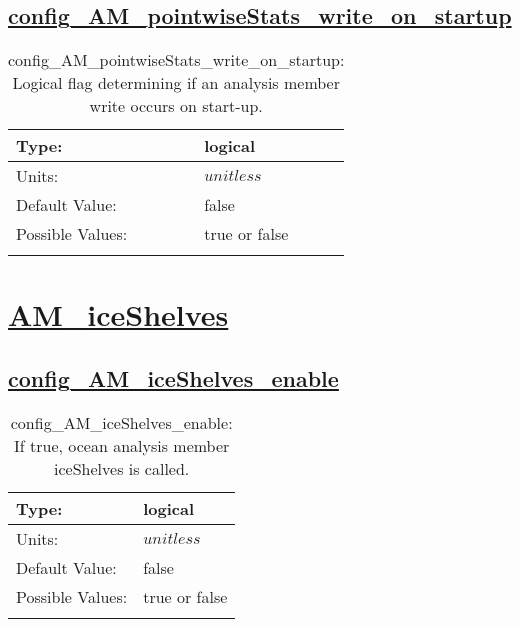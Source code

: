 \subsection[config\_AM\_pointwiseStats\_write\_on\_startup]{\hyperref[sec:nm_tab_AM_pointwiseStats]{config\_AM\_pointwiseStats\_write\_on\_startup}}
\label{subsec:nm_sec_config_AM_pointwiseStats_write_on_startup}
\begin{center}
\begin{longtable}{| p{2.0in} || p{4.0in} |}
    \hline
    Type: & logical \\
    \hline
    Units: & $unitless$ \\
    \hline
    Default Value: & false \\
    \hline
    Possible Values: & true or false \\
    \hline
    \caption{config\_AM\_pointwiseStats\_write\_on\_startup: Logical flag determining if an analysis member write occurs on start-up.}
\end{longtable}
\end{center}
\section[AM\_iceShelves]{\hyperref[sec:nm_tab_AM_iceShelves]{AM\_iceShelves}}
\label{sec:nm_sec_AM_iceShelves}
\subsection[config\_AM\_iceShelves\_enable]{\hyperref[sec:nm_tab_AM_iceShelves]{config\_AM\_iceShelves\_enable}}
\label{subsec:nm_sec_config_AM_iceShelves_enable}
\begin{center}
\begin{longtable}{| p{2.0in} || p{4.0in} |}
    \hline
    Type: & logical \\
    \hline
    Units: & $unitless$ \\
    \hline
    Default Value: & false \\
    \hline
    Possible Values: & true or false \\
    \hline
    \caption{config\_AM\_iceShelves\_enable: If true, ocean analysis member iceShelves is called.}
\end{longtable}
\end{center}
